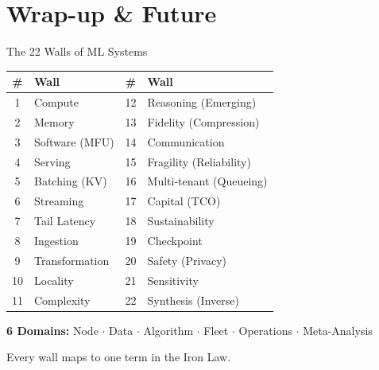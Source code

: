 \documentclass[aspectratio=169, 12pt]{beamer}
\begin{document}
\section{Wrap-up \& Future}

\begin{frame}{The 22 Walls of ML Systems}
\centering
\small
\begin{tabular}{clcl}
\toprule
\textbf{\#} & \textbf{Wall} & \textbf{\#} & \textbf{Wall} \\
\midrule
1  & Compute         & 12 & Reasoning (Emerging) \\
2  & Memory          & 13 & Fidelity (Compression) \\
3  & Software (MFU)  & 14 & Communication \\
4  & Serving         & 15 & Fragility (Reliability) \\
5  & Batching (KV)   & 16 & Multi-tenant (Queueing) \\
6  & Streaming       & 17 & Capital (TCO) \\
7  & Tail Latency    & 18 & Sustainability \\
8  & Ingestion       & 19 & Checkpoint \\
9  & Transformation  & 20 & Safety (Privacy) \\
10 & Locality        & 21 & Sensitivity \\
11 & Complexity      & 22 & Synthesis (Inverse) \\
\bottomrule
\end{tabular}

\vspace{0.5em}
\textbf{6 Domains:} Node $\cdot$ Data $\cdot$ Algorithm $\cdot$ Fleet $\cdot$ Operations $\cdot$ Meta-Analysis

\vspace{0.3em}
\alert{Every wall maps to one term in the Iron Law.}
\end{frame}
\end{document}
